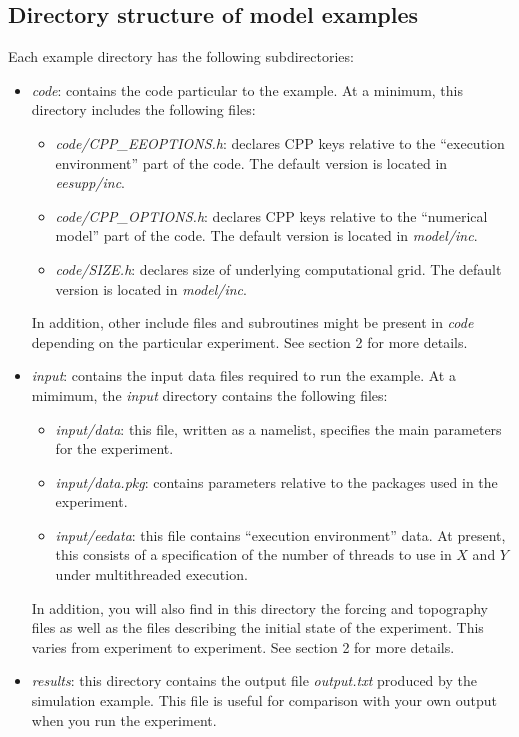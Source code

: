 \subsection{Directory structure of model examples}

Each example directory has the following subdirectories:

\begin{itemize}
\item \textit{code}: contains the code particular to the example. At a
minimum, this directory includes the following files:

\begin{itemize}
\item \textit{code/CPP\_EEOPTIONS.h}: declares CPP keys relative to the
``execution environment'' part of the code. The default version is located
in \textit{eesupp/inc}.

\item \textit{code/CPP\_OPTIONS.h}: declares CPP keys relative to the
``numerical model'' part of the code. The default version is located in 
\textit{model/inc}.

\item \textit{code/SIZE.h}: declares size of underlying computational grid.
The default version is located in \textit{model/inc}.
\end{itemize}

In addition, other include files and subroutines might be present in \textit{%
code} depending on the particular experiment. See section 2 for more details.

\item \textit{input}: contains the input data files required to run the
example. At a mimimum, the \textit{input} directory contains the following
files:

\begin{itemize}
\item \textit{input/data}: this file, written as a namelist, specifies the
main parameters for the experiment.

\item \textit{input/data.pkg}: contains parameters relative to the packages
used in the experiment.

\item \textit{input/eedata}: this file contains ``execution environment''
data. At present, this consists of a specification of the number of threads
to use in $X$ and $Y$ under multithreaded execution.
\end{itemize}

In addition, you will also find in this directory the forcing and topography
files as well as the files describing the initial state of the experiment.
This varies from experiment to experiment. See section 2 for more details.

\item \textit{results}: this directory contains the output file \textit{%
output.txt} produced by the simulation example. This file is useful for
comparison with your own output when you run the experiment.
\end{itemize}

